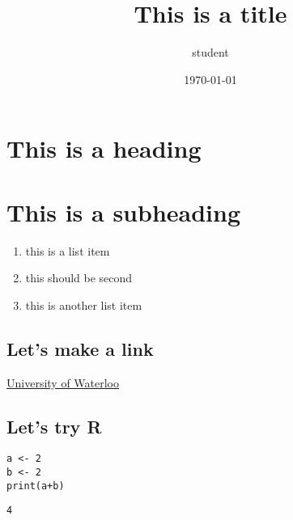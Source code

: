 \documentclass[11pt]{article}
\author{student}
\date{\today}
\title{This is a title}
\begin{document}
\maketitle
\tableofcontents


\section{This is a heading}
\label{sec:orgb7a0e10}
\section{This is a subheading}
\label{sec:org5b12ee8}

\begin{enumerate}
\item this is a list item
\item this should be second
\item this is another list item
\end{enumerate}

\subsection{Let's make a link}
\label{sec:orgc7b4391}

\href{https://uwaterloo.ca}{University of Waterloo}

\subsection{Let's try R}
\label{sec:org7094e5f}

\begin{verbatim}
a <- 2
b <- 2
print(a+b)
\end{verbatim}

\begin{verbatim}
4
\end{verbatim}
\end{document}

